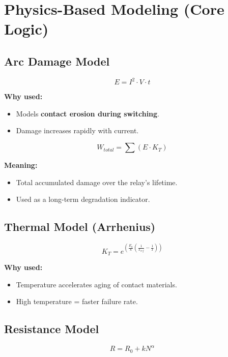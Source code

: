 \documentclass[12pt]{article}
\begin{document}

\section{Physics-Based Modeling (Core Logic)}

\subsection{Arc Damage Model}

\[
E = I^2 \cdot V \cdot t
\]

\textbf{Why used:}
\begin{itemize}
  \item Models \textbf{contact erosion during switching}.
  \item Damage increases rapidly with current.
\end{itemize}

\[
W_{total} = \sum (E \cdot K_T)
\]

\textbf{Meaning:}
\begin{itemize}
  \item Total accumulated damage over the relay's lifetime.
  \item Used as a long-term degradation indicator.
\end{itemize}


\subsection{Thermal Model (Arrhenius)}

\[
K_T = e^{\left(\frac{E_a}{k}\left(\frac{1}{T_{ref}} - \frac{1}{T}\right)\right)}
\]

\textbf{Why used:}
\begin{itemize}
  \item Temperature accelerates aging of contact materials.
  \item High temperature = faster failure rate.
\end{itemize}


\subsection{Resistance Model}

\[
R = R_0 + kN^\alpha
\]
\end{document}
